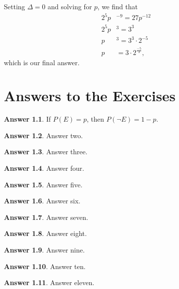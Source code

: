 \documentclass{book}
\theoremstyle{definition}
\newtheorem{answer}{Answer}[chapter]
\theoremstyle{colonstylebf}
\begin{document}
Setting $\Delta = 0$ and solving for $p$, we find that
\begin{align*}
2^5p&^{-9} = 27p^{-12}\\
2^5p&^3 = 3^3\\
p&^3 = 3^3\cdot 2^{-5}\\
p& = 3\cdot 2^{\frac{-5}{3}},
\end{align*}
which is our final answer.





\appendix
\chapter{Answers to the Exercises}\label{answers}
\renewcommand{\thechapter}{\arabic{chapter}}
\begin{answer}
If $P(E) = p$, then $P(\neg E) = 1 - p$.
\end{answer}

\begin{answer}%
  Answer two.
\end{answer}

\begin{answer}%
  Answer three.
\end{answer}

\begin{answer}%
  Answer four.
\end{answer}

\begin{answer}%
  Answer five.
\end{answer}

\begin{answer}%
  Answer six.
\end{answer}

\begin{answer}%
  Answer seven.
\end{answer}

\begin{answer}%
  Answer eight.
\end{answer}

\begin{answer}%
  Answer nine.
\end{answer}

\begin{answer}%
  Answer ten.
\end{answer}

\begin{answer}%
  Answer eleven.
\end{answer}
\end{document}
